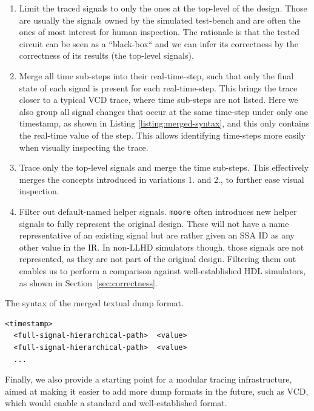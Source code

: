 \begin{enumerate}
    \item Limit the traced signals to only the ones at the top-level of the design. Those are usually the signals owned by the simulated test-bench and are often the ones of most interest for human inspection. The rationale is that the tested circuit can be seen as a “black-box“ and we can infer its correctness by the correctness of its results (the top-level signals).
    \item Merge all time sub-steps into their real-time-step, such that only the final state of each signal is present for each real-time-step. This brings the trace closer to a typical VCD trace, where time sub-steps are not listed. Here we also group all signal changes that occur at the same time-step under only one timestamp, as shown in Listing \ref{listing:merged-syntax}, and this only contains the real-time value of the step. This allows identifying time-steps more easily when visually inspecting the trace.
    \item Trace only the top-level signals and merge the time sub-steps. This effectively merges the concepts introduced in variations 1. and 2., to further ease visual inspection.
    \item Filter out default-named helper signals. \texttt{moore} often introduces new helper signals to fully represent the original design. These will not have a name representative of an existing signal but are rather given an SSA ID as any other value in the IR. In non-LLHD simulators though, those signals are not represented, as they are not part of the original design. Filtering them out enables us to perform a comparison against well-established HDL simulators, as shown in Section~\ref{sec:correctness}.
\end{enumerate}

\begin{listing}
    \caption{The syntax of the merged textual dump format.}
    \label{listing:merged-syntax}
    \centering
    \begin{minipage}{0.6\textwidth}
        \begin{verbatim}
<timestamp>
  <full-signal-hierarchical-path>  <value>
  <full-signal-hierarchical-path>  <value>
  ...
            \end{verbatim}
    \end{minipage}
\end{listing}

Finally, we also provide a starting point for a modular tracing infrastructure, aimed at making it easier to add more dump formats in the future, such as VCD, which would enable a standard and well-established format.


